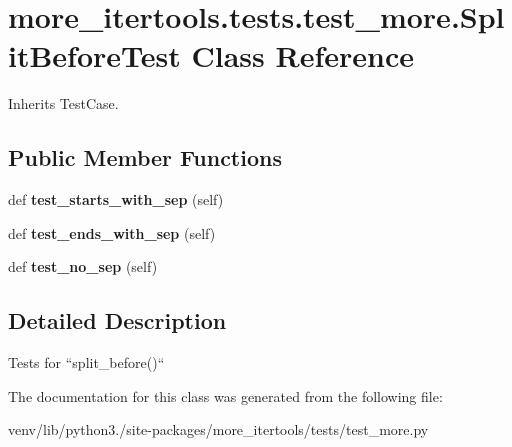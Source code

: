 \hypertarget{classmore__itertools_1_1tests_1_1test__more_1_1_split_before_test}{}\section{more\+\_\+itertools.\+tests.\+test\+\_\+more.\+Split\+Before\+Test Class Reference}
\label{classmore__itertools_1_1tests_1_1test__more_1_1_split_before_test}


Inherits Test\+Case.

\subsection*{Public Member Functions}
\begin{DoxyCompactItemize}
\item 
\mbox{\label{classmore__itertools_1_1tests_1_1test__more_1_1_split_before_test_ad49e026133c116f3633902357557e39c}} 
def {\bfseries test\+\_\+starts\+\_\+with\+\_\+sep} (self)
\item 
\mbox{\label{classmore__itertools_1_1tests_1_1test__more_1_1_split_before_test_a75768b6f8219ef5c600a9151dcca5366}} 
def {\bfseries test\+\_\+ends\+\_\+with\+\_\+sep} (self)
\item 
\mbox{\label{classmore__itertools_1_1tests_1_1test__more_1_1_split_before_test_a45390ff7c62a5f00d9e0327c328d5eea}} 
def {\bfseries test\+\_\+no\+\_\+sep} (self)
\end{DoxyCompactItemize}


\subsection{Detailed Description}
\begin{DoxyVerb}Tests for ``split_before()``\end{DoxyVerb}
 

The documentation for this class was generated from the following file\+:\begin{DoxyCompactItemize}
\item 
venv/lib/python3./site-\/packages/more\+\_\+itertools/tests/test\+\_\+more.\+py\end{DoxyCompactItemize}
